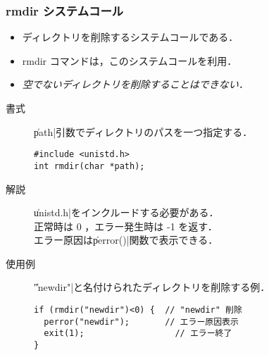 \documentclass{beamer}                 %
\begin{document}
\begin{frame}[fragile]
  \frametitle{rmdir システムコール}
  \begin{itemize}
  \item ディレクトリを削除するシステムコールである．
  \item rmdir コマンドは，このシステムコールを利用．
  \item \emph{空でないディレクトリを削除することはできない．}
  \end{itemize}

  \begin{description}
  \item[書式] \|path|引数でディレクトリのパスを一つ指定する．
\begin{verbatim}
#include <unistd.h>
int rmdir(char *path);
\end{verbatim}

  \item[解説] \|unistd.h|をインクルードする必要がある．\\
    正常時は 0 ，エラー発生時は -1 を返す．\\
    エラー原因は\|perror()|関数で表示できる．

  \item[使用例] \|"newdir"|と名付けられたディレクトリを削除する例．
\begin{verbatim}
if (rmdir("newdir")<0) {  // "newdir" 削除
  perror("newdir");       // エラー原因表示
  exit(1);                  // エラー終了
}
\end{verbatim}
  \end{description}
\end{frame}
\end{document}
